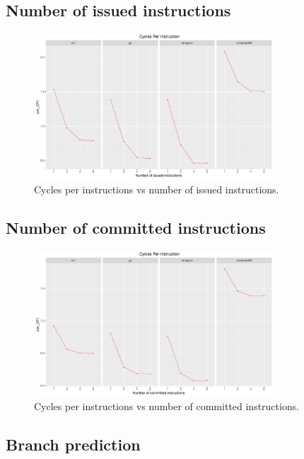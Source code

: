\documentclass[10pt]{scrartcl}
\begin{document}
\FloatBarrier

\subsection{Number of issued instructions}

\begin{figure}[h]
  \centering
  \includegraphics[width=0.8\textwidth]{Plots/plot_I_sim_CPI}
  \caption{Cycles per instructions vs number of issued instructions.}\label{fig:i_sim_cpi}
\end{figure}

\FloatBarrier

\subsection{Number of committed instructions}

\begin{figure}[h]
  \centering
  \includegraphics[width=0.8\textwidth]{Plots/plot_C_sim_CPI}
  \caption{Cycles per instructions vs number of committed instructions.}\label{fig:c_sim_cpi}
\end{figure}

\FloatBarrier

\subsection{Branch prediction}
\end{document}
